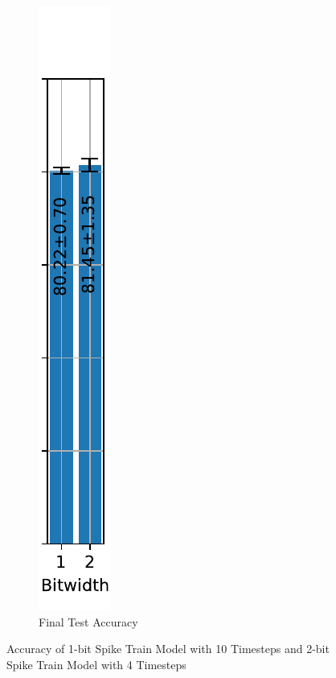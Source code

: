 \begin{figure}[H]
\begin{subfigure}[H]{0.1\textwidth}
                \includegraphics[width=\textwidth]{../timesteps/CIFAR10/plots/cifar10_final_acc.pdf}
                \caption{Final Test Accuracy}
            \end{subfigure}
            \caption{Accuracy of 1-bit Spike Train Model with 10 Timesteps and 2-bit Spike Train Model with 4 Timesteps}
        \end{figure}

